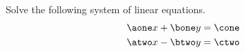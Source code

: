 









\pgfmathtruncatemacro{\money}{\lcmy/\bone}
\pgfmathtruncatemacro{\mtwoy}{\lcmy/\btwo}


\pgfmathtruncatemacro{\maone}{\money*\aone}
\pgfmathtruncatemacro{\matwo}{\mtwoy*\atwo}


\pgfmathtruncatemacro{\cone}{\aone*\x+\bone*\y}
\pgfmathtruncatemacro{\ctwo}{\atwo*\x-\btwo*\y}


\pgfmathtruncatemacro{\monecone}{\money*\cone}
\pgfmathtruncatemacro{\mtwoctwo}{\mtwoy*\ctwo}


\pgfmathtruncatemacro{\coefx}{\maone+\matwo}

\pgfmathtruncatemacro{\cthree}{\monecone+\mtwoctwo}


\pgfmathtruncatemacro{\aonetimesx}{\aone*\x}


\pgfmathtruncatemacro{\coneminusaonex}{\cone-\aone*\x}




\setcounter{equation}{0}


Solve the following system of linear equations.
\begin{align}
\aone x + \bone y &= \cone  \label{eq-I002-1}\\
\atwo x - \btwo y &= \ctwo  \label{eq-I002-2}
\end{align}

